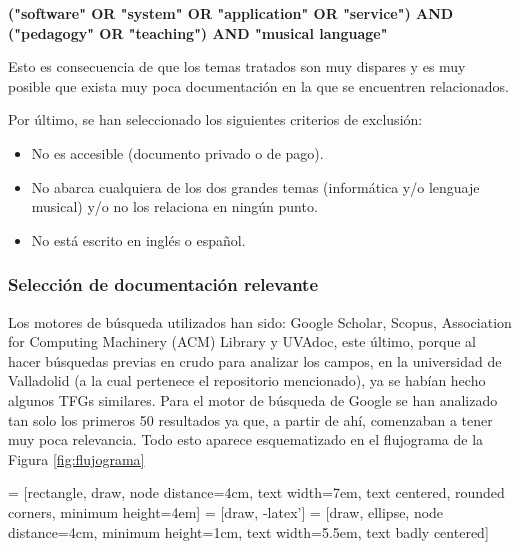 \textbf{("software" OR "system" OR "application" OR "service") AND ("pedagogy" OR "teaching") AND "musical language"}

Esto es consecuencia de que los temas tratados son muy dispares y es muy posible que exista muy poca documentación en la que se encuentren relacionados.

Por último, se han seleccionado los siguientes criterios de exclusión:

\begin{itemize}
\item No es accesible (documento privado o de pago).
\item No abarca cualquiera de los dos grandes temas (informática y/o lenguaje musical) y/o no los relaciona en ningún punto.
\item No está escrito en inglés o español.
\end{itemize}

\subsubsection{Selección de documentación relevante}

Los motores de búsqueda utilizados han sido: Google Scholar, Scopus, Association for Computing Machinery (ACM) Library y UVAdoc, este último, porque al hacer búsquedas previas en crudo para analizar los campos, en la universidad de Valladolid (a la cual pertenece el repositorio mencionado), ya se habían hecho algunos TFGs similares. Para el motor de búsqueda de Google se han analizado tan solo los primeros 50 resultados ya que, a partir de ahí, comenzaban a tener muy poca relevancia. Todo esto aparece esquematizado en el flujograma de la Figura \ref{fig:flujograma}

 = [rectangle, draw, node distance=4cm,
text width=7em, text centered, rounded corners, minimum height=4em]
 = [draw, -latex']
 = [draw, ellipse, node distance=4cm,
minimum height=1cm, text width=5.5em, text badly centered]

